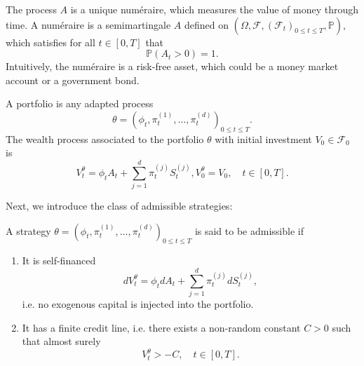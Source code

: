 
The process $A$ is a unique numéraire, which measures the value of money through time. A numéraire is a semimartingale $A$ defined on $(\Omega,\mathcal{F},(\mathcal{F}_{t})_{0\leq t\leq T},\mathbb{P})$, which satisfies for all $t\in [0,T]$ that 
\begin{equation}
    \mathbb{P}(A_{t}>0)=1.
\end{equation}
Intuitively, the numéraire is a risk-free asset, which could be a money market account or a government bond.
\begin{defn}
    A portfolio is any adapted process
    \begin{equation}
        \theta=(\phi_{t},\pi_{t}^{(1)},\dots,\pi_{t}^{(d)})_{0\leq t\leq T}.
    \end{equation}
    The wealth process associated to the portfolio $\theta$ with initial investment $V_{0}\in \mathcal{F}_{0}$ is
    \begin{equation}
        V_{t}^{\theta}=\phi_{t}A_{t}+\sum_{j=1}^{d}\pi_{t}^{(j)}S_{t}^{(j)}, V_{0}^{\theta}=V_{0}, \quad t\in [0,T].
    \end{equation}
\end{defn}
Next, we introduce the class of admissible strategies:
\begin{defn}
    A strategy $\theta=(\phi_{t},\pi_{t}^{(1)},\dots,\pi_{t}^{(d)})_{0\leq t\leq T}$ is said to be admissible if
    \begin{enumerate}
        \item It is self-financed
        \begin{equation}
            dV_{t}^{\theta}=\phi_{t}dA_{t}+\sum_{j=1}^{d}\pi_{t}^{(j)}dS_{t}^{(j)},
        \end{equation}
        i.e. no exogenous capital is injected into the portfolio.
        \item It has a finite credit line, i.e. there exists a non-random constant $C>0$ such that almost surely
        \begin{equation}
            V_{t}^{\theta}>-C, \quad t\in [0,T].
        \end{equation}
    \end{enumerate}
\end{defn}
